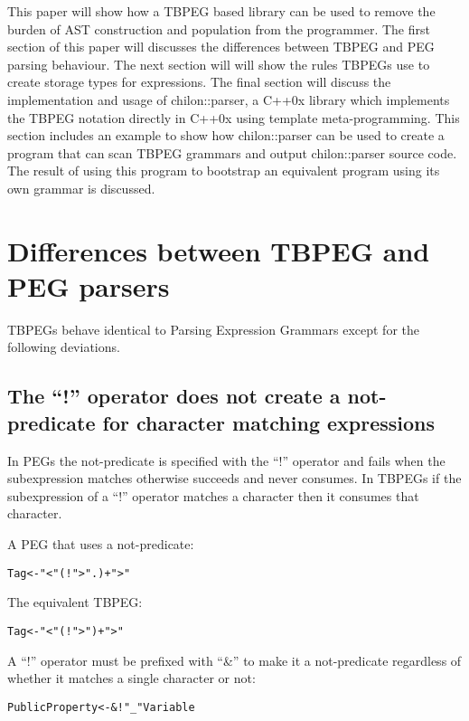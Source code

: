\documentclass[a4paper,11pt]{article}
\begin{document}
This paper will show how a TBPEG based library can be used to remove the burden of AST construction and population from the programmer.
The first section of this paper will discusses the differences between TBPEG and PEG parsing behaviour.
The next section will will show the rules TBPEGs use to create storage types for expressions.
The final section will discuss the implementation and usage of chilon::parser, a C++0x library which implements the TBPEG notation directly in C++0x using template meta-programming.
This section includes an example to show how chilon::parser can be used to create a program that can scan TBPEG grammars and output chilon::parser source code.
The result of using this program to bootstrap an equivalent program using its own grammar is discussed.

\section{Differences between TBPEG and PEG parsers}

TBPEGs behave identical to Parsing Expression Grammars\cite{peg} except for the following deviations.

\subsection{The ``!'' operator does not create a not-predicate for character matching expressions}

In PEGs the not-predicate is specified with the ``!'' operator and fails when the subexpression matches otherwise succeeds and never consumes.
In TBPEGs if the subexpression of a ``!'' operator matches a character then it consumes that character.

A PEG that uses a not-predicate:
\begin{alltt}
    Tag <- "<" (! ">" .)+ ">"
\end{alltt}

The equivalent TBPEG:
\begin{alltt}
    Tag <- "<" (! ">")+ ">"
\end{alltt}

A ``!'' operator must be prefixed with ``\&'' to make it a not-predicate regardless of whether it matches a single character or not:
\begin{alltt}
    PublicProperty <- &!"_" Variable
\end{alltt}
\end{document}
